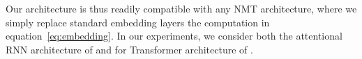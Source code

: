 \documentclass[a4paper]{article}
\newcommand{\fyTodo}[1]{\Todo[FY:]{\textcolor{orange}{#1}}}
\begin{document}
Our architecture is thus readily compatible with any NMT architecture, where we simply replace standard embedding layers the computation in equation~\eqref{eq:embedding}. In our experiments, we consider both the attentional RNN architecture of \cite{Bahdanau15learning} and for Transformer architecture of \cite{Vaswani17attention}.


\end{document}
